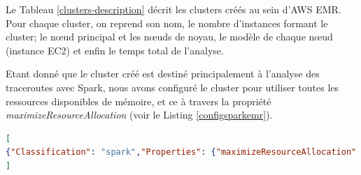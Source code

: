 Le Tableau \ref{clusters-description} décrit les clusters créés au sein d'AWS EMR. Pour chaque cluster, on reprend son nom, le nombre d'instances formant le cluster; le n\oe{}ud principal et  les n\oe{}uds de noyau, le modèle de chaque n\oe{}ud (instance EC2) et enfin le temps total de l'analyse. 

\begin{table}[H]
	\centering
\caption{Description des clusters utilisés avec le temps total d'exécution sur les données A}
\label{clusters-description}
\end{table}

Etant donné que le cluster créé est destiné principalement à l'analyse des traceroutes avec Spark, nous avons configuré le cluster pour utiliser toutes les ressources disponibles de mémoire, et ce à travers la propriété \textit{maximizeResourceAllocation} (voir le Listing \ref{configsparkemr}). 

\begin{lstlisting}[language=json, basicstyle=\small, label= configsparkemr, caption = Exemple de fichier de configuration d'un cluster Amazon EMR]
[
{"Classification": "spark","Properties": {"maximizeResourceAllocation": "true"} }
]
\end{lstlisting}





